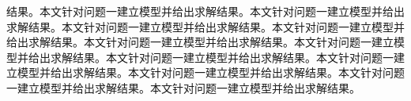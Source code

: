 结果。本文针对问题一建立模型并给出求解结果。本文针对问题一建立模型并给出求解结果。本文针对问题一建立模型并给出求解结果。本文针对问题一建立模型并给出求解结果。本文针对问题一建立模型并给出求解结果。本文针对问题一建立模型并给出求解结果。本文针对问题一建立模型并给出求解结果。本文针对问题一建立模型并给出求解结果。本文针对问题一建立模型并给出求解结果。本文针对问题一建立模型并给出求解结果。本文针对问题一建立模型并给出求解结果。
